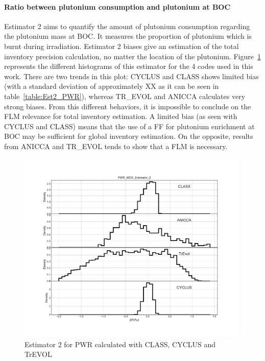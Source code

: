 \paragraph{Ratio between plutonium consumption and plutonium at BOC}
Estimator 2 aims to quantify the amount of plutonium consumption regarding the plutonium mass at BOC. It measures the proportion of plutonium which is burnt during irradiation. Estimator 2 biases give an estimation of the total inventory precision calculation, no matter the location of the plutonium. 
Figure~\ref{fig:Est2_PWR} represents the different histograms of this estimator for the 4 codes used in this work. There are two trends in this plot: CYCLUS and CLASS shows limited bias (with a standard deviation of approximately XX as it can be seen in table~\ref{table:Est2_PWR}), whereas TR\_EVOL and ANICCA calculates very strong biases. From this different behaviors, it is impossible to conclude on the FLM relevance for total inventory estimation. A limited bias (as seen with CYCLUS and CLASS) means that the use of a FF for plutonium enrichment at BOC may be sufficient for global inventory estimation. On the opposite, results from ANICCA and TR\_EVOL tends to show that a FLM is necessary. 

\begin{figure}[h]
	\begin{center}
		\includegraphics[width = 0.99\textwidth]{../../Feature_1/RAW_DATA/FIG/PWR_MOX_Estimator_2.pdf}
		\caption{Estimator 2 for PWR calculated with CLASS, CYCLUS and TrEVOL}
		\label{fig:Est2_PWR}
	\end{center}
\end{figure}

